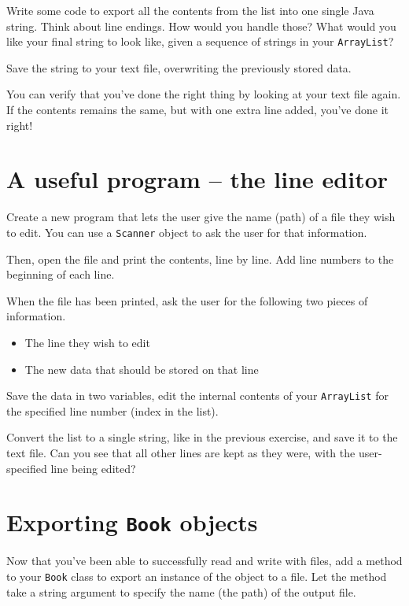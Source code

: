 \documentclass[a4paper, english]{article}
\begin{document}
        Write some code to export all the contents from the list into one single Java string. Think about line endings. How would you handle those? What would you like your final string to look like, given a sequence of strings in your \texttt{ArrayList}?

        Save the string to your text file, overwriting the previously stored data.

        You can verify that you've done the right thing by looking at your text file again. If the contents remains the same, but with one extra line added, you've done it right!
    
    \section{A useful program -- the line editor}
        Create a new program that lets the user give the name (path) of a file they wish to edit. You can use a \texttt{Scanner} object to ask the user for that information.

        Then, open the file and print the contents, line by line. Add line numbers to the beginning of each line.

        When the file has been printed, ask the user for the following two pieces of information.

        \begin{itemize}
            \item The line they wish to edit
            \item The new data that should be stored on that line
        \end{itemize}

        Save the data in two variables, edit the internal contents of your \texttt{ArrayList} for the specified line number (index in the list).

        Convert the list to a single string, like in the previous exercise, and save it to the text file. Can you see that all other lines are kept as they were, with the user-specified line being edited?
    
    \newpage
    \section{Exporting \texttt{Book} objects}
        Now that you've been able to successfully read and write with files, add a method to your \texttt{Book} class to export an instance of the object to a file. Let the method take a string argument to specify the name (the path) of the output file.
        
\end{document}
